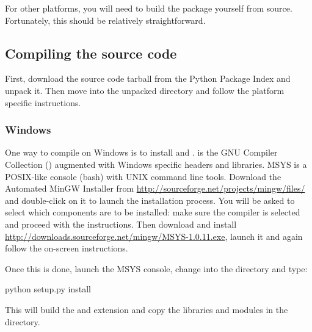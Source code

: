 \documentclass[]{jss}
\begin{document}
For other platforms, you will need to build the package yourself from source.
Fortunately, this should be relatively straightforward.



\subsection{Compiling the source code}
  \label{compiling-the-source-code}%


First, download the source code tarball from the Python Package Index and unpack it. Then move
into the unpacked directory and follow the platform specific instructions.



\subsubsection{Windows}
  \label{windows}%


One way to compile  on Windows is to install  \citep{mingw} and .  is
the GNU Compiler Collection () augmented with Windows specific headers and
libraries. MSYS is a POSIX-like console (bash) with UNIX command line tools.
Download the Automated MinGW Installer from \href{http://sourceforge.net/projects/mingw/files/}{http://sourceforge.net/projects/mingw/files/} and double-click on it to launch
the installation process. You will be asked to select which
components are to be installed: make sure the  \citep{gcc} compiler is selected and
proceed with the instructions. Then download and install \href{http://downloads.sourceforge.net/mingw/MSYS-1.0.11.exe}{http://downloads.sourceforge.net/mingw/MSYS-1.0.11.exe},
launch it and again follow the on-screen instructions.

Once this is done, launch the MSYS console, change into the  directory and
type:
\begin{CodeInput}
python setup.py install
\end{CodeInput}

This will build the  and  extension and copy the libraries and  
modules in the  directory.


\end{document}
